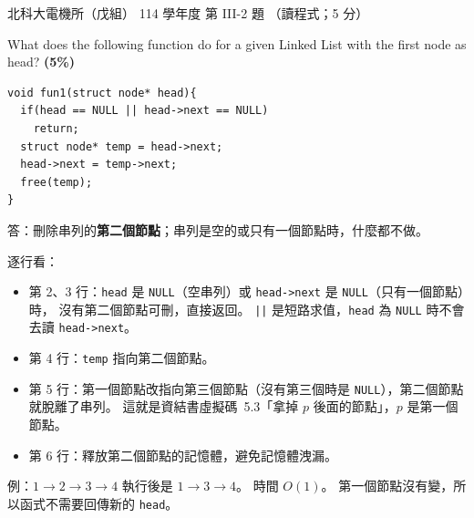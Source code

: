\begin{pastexam}[label={px:ntut-114-ee-ds-10}]{北科大電機所（戊組） 114 學年度 第 III-2 題}
（讀程式；5 分）

What does the following function do for a given Linked List with the first node as head? \textbf{(5\%)}
\begin{verbatim}
void fun1(struct node* head){
  if(head == NULL || head->next == NULL)
    return;
  struct node* temp = head->next;
  head->next = temp->next;
  free(temp);
}
\end{verbatim}
\end{pastexam}

\begin{pastsoln}
答：刪除串列的\textbf{第二個節點}；串列是空的或只有一個節點時，什麼都不做。

逐行看：
\begin{itemize}
\item 第 2、3 行：\texttt{head} 是 \texttt{NULL}（空串列）或 \texttt{head->next} 是 \texttt{NULL}（只有一個節點）時，
沒有第二個節點可刪，直接返回。 \texttt{||} 是短路求值，\texttt{head} 為 \texttt{NULL} 時不會去讀
\texttt{head->next}。
\item 第 4 行：\texttt{temp} 指向第二個節點。
\item 第 5 行：第一個節點改指向第三個節點（沒有第三個時是 \texttt{NULL}），第二個節點就脫離了串列。
這就是資結書虛擬碼~5.3「拿掉 $p$ 後面的節點」，$p$ 是第一個節點。
\item 第 6 行：釋放第二個節點的記憶體，避免記憶體洩漏。
\end{itemize}
例：$1 \to 2 \to 3 \to 4$ 執行後是 $1 \to 3 \to 4$。 時間 $O(1)$。 第一個節點沒有變，所以函式不需要回傳新的
\texttt{head}。
\end{pastsoln}

